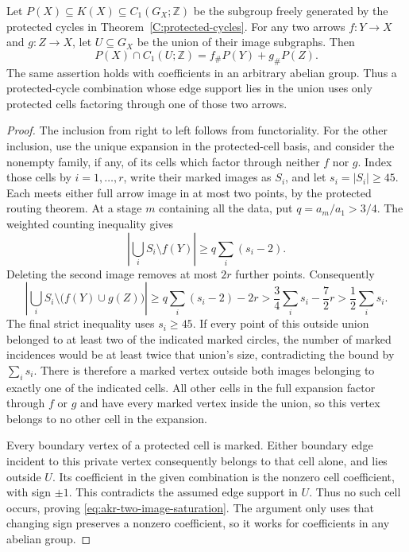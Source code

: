 \begin{proposition}
\label{C:protected-two-images}
Let $P(X)\subseteq K(X)\subseteq C_1(G_X;\mathbb Z)$ be the subgroup
freely generated by the protected cycles in
Theorem~\ref{C:protected-cycles}. For any two arrows
$f:Y\to X$ and $g:Z\to X$, let $U\subseteq G_X$ be the union of
their image subgraphs. Then
\[
 P(X)\cap C_1(U;\mathbb Z)
       = f_\#P(Y)+g_\#P(Z).
 \tag{PI}\label{eq:akr-two-image-saturation}
\]
The same assertion holds with coefficients in an arbitrary abelian
group. Thus a protected-cycle combination whose edge support lies in
the union uses only protected cells factoring through one of those
two arrows.
\end{proposition}

\begin{proof}
The inclusion from right to left follows from functoriality. For the
other inclusion, use the unique expansion in the protected-cell
basis, and consider the nonempty family, if any, of its cells which
factor through neither $f$ nor $g$. Index those cells by
$i=1,\ldots,r$, write their marked images as $S_i$, and let
$s_i=|S_i|\geq45$. Each meets either full arrow image in at most two
points, by the protected routing theorem. At a stage $m$ containing
all the data, put $q=a_m/a_1>3/4$. The weighted counting inequality
gives
\[
 \left|\bigcup_i S_i\setminus f(Y)\right|
       \geq q\sum_i(s_i-2).
\]
Deleting the second image removes at most $2r$ further points.
Consequently
\[
 \left|\bigcup_i S_i\setminus\bigl(f(Y)\cup g(Z)\bigr)\right|
 \geq q\sum_i(s_i-2)-2r
 >\frac34\sum_i s_i-\frac72r
 >\frac12\sum_i s_i.
\]
The final strict inequality uses $s_i\geq45$. If every point of this
outside union belonged to at least two of the indicated marked
circles, the number of marked incidences would be at least twice
that union's size, contradicting the bound by $\sum_i s_i$. There is
therefore a marked vertex outside both images belonging to exactly
one of the indicated cells. All other cells in the full expansion
factor through $f$ or $g$ and have every marked vertex inside the
union, so this vertex belongs to no other cell in the expansion.

Every boundary vertex of a protected cell is marked. Either boundary
edge incident to this private vertex consequently belongs to that
cell alone, and lies outside $U$. Its coefficient in the given
combination is the nonzero cell coefficient, with sign $\pm1$.
This contradicts the assumed edge support in $U$. Thus no such cell
occurs, proving \eqref{eq:akr-two-image-saturation}. The argument only
uses that changing sign preserves a nonzero coefficient, so it works
for coefficients in any abelian group.
\end{proof}

